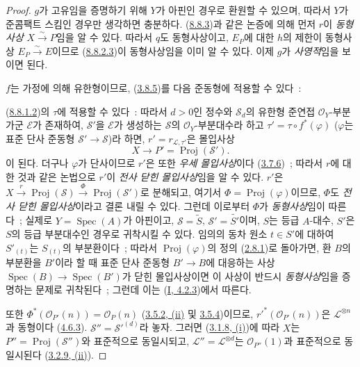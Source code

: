 \begin{proof}
$g$가 고유임을 증명하기 위해 $Y$가 아핀인 경우로 환원할 수 있으며,
따라서 $Y$가 준콤팩트 스킴인 경우만 생각하면 충분하다.
(\hyperref[II.8.8.3-ko]{8.8.3})과 같은 논증에 의해 먼저 $r$이
\emph{동형사상} $X\xrightarrow{\sim}P$임을 알 수 있다. 따라서 $q$도
동형사상이고, $E_P$에 대한 $h$의 제한이 동형사상
$E_P\xrightarrow{\sim}E$이므로
(\hyperref[II.8.8.2.3-ko]{8.8.2.3})이 동형사상임을 이미 알 수 있다.
이제 $g$가 \emph{사영적}임을 보이면 된다.

$f$는 가정에 의해 유한형이므로, (\hyperref[II.3.8.5-ko]{3.8.5})를
다음 준동형에 적용할 수 있다~:

(\hyperref[II.8.8.1.2-ko]{8.8.1.2})의 $\tau$에 적용할 수 있다~: 따라서
$d>0$인 정수와 $\mathcal{S}_d$의 유한형 준연접
$\mathcal{O}_Y$-부분가군 $\mathcal{E}$가 존재하여, $\mathcal{S}'$을
$\mathcal{E}$가 생성하는 $\mathcal{S}$의 $\mathcal{O}_Y$-부분대수라 하고
$\tau'=\tau\circ f^*(\varphi)$ ($\varphi$는 표준 단사 준동형
$\mathcal{S}'\to\mathcal{S}$)라 하면, $r'=r_{\mathcal{L},\tau'}$은 몰입사상
\[
  X\longrightarrow P'=\operatorname{Proj}(\mathcal{S}').
\]
이 된다. 더구나 $\varphi$가 단사이므로 $r'$은 또한 \emph{우세
몰입사상}이다 (\hyperref[II.3.7.6-ko]{3.7.6})~; 따라서 $r$에 대한 것과
같은 논법으로 $r'$이 \emph{전사 닫힌 몰입사상}임을 알 수 있다. $r'$은
$X\xrightarrow{r}\operatorname{Proj}(\mathcal{S})
\xrightarrow{\Phi}\operatorname{Proj}(\mathcal{S}')$로 분해되고, 여기서
$\Phi=\operatorname{Proj}(\varphi)$이므로, $\Phi$도 \emph{전사 닫힌
몰입사상}이라고 결론 내릴 수 있다. 그런데 이로부터 $\Phi$가
\emph{동형사상}임이 따른다~; 실제로
$Y=\operatorname{Spec}(A)$가 아핀이고, $\mathcal{S}=\widetilde{S}$,
$\mathcal{S}'=\widetilde{S'}$이며, $S$는 등급 $A$-대수, $S'$은 $S$의
등급 부분대수인 경우로 귀착시킬 수 있다. 임의의 동차 원소 $t\in S'$에
대하여 $S'_{(t)}$는 $S_{(t)}$의 부분환이다~; 따라서
$\operatorname{Proj}(\varphi)$의 정의
(\hyperref[II.2.8.1-ko]{2.8.1})로 돌아가면, 환 $B$의 부분환을 $B'$이라
할 때 표준 단사 준동형 $B'\to B$에 대응하는 사상
$\operatorname{Spec}(B)\to\operatorname{Spec}(B')$가 닫힌 몰입사상이면
이 사상이 반드시 \emph{동형사상}임을 증명하는 문제로 귀착된다~; 그런데
이는 (\hyperref[I.4.2.3-ko]{I, 4.2.3})에서 따른다.

또한
$\Phi^*(\mathcal{O}_{P'}(n))=\mathcal{O}_P(n)$
(\hyperref[II.3.5.2-ko]{3.5.2, (ii)} 및
\hyperref[II.3.5.4-ko]{3.5.4})이므로,
$r'^*(\mathcal{O}_{P'}(n))$은 $\mathcal{L}^{\otimes n}$과 동형이다
(\hyperref[II.4.6.3-ko]{4.6.3}). $\mathcal{S}''=\mathcal{S}'^{(d)}$라
놓자. 그러면 (\hyperref[II.3.1.8-ko]{3.1.8, (i)})에 따라 $X$는
$P''=\operatorname{Proj}(\mathcal{S}'')$와 표준적으로 동일시되고,
$\mathcal{L}''=\mathcal{L}^{\otimes d}$는 $\mathcal{O}_{P''}(1)$과
표준적으로 동일시된다 (\hyperref[II.3.2.9-ko]{3.2.9, (ii)}).


\end{proof}
